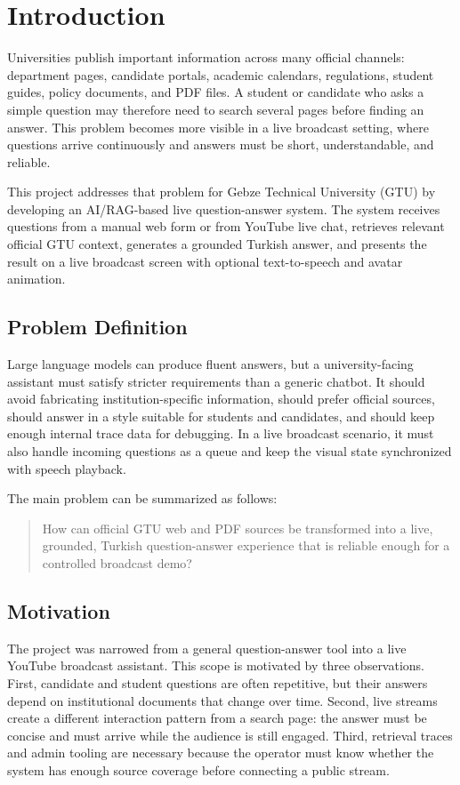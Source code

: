 \chapter{Introduction}

Universities publish important information across many official channels: department pages, candidate portals, academic calendars, regulations, student guides, policy documents, and PDF files. A student or candidate who asks a simple question may therefore need to search several pages before finding an answer. This problem becomes more visible in a live broadcast setting, where questions arrive continuously and answers must be short, understandable, and reliable.

This project addresses that problem for Gebze Technical University (GTU) by developing an AI/RAG-based live question-answer system. The system receives questions from a manual web form or from YouTube live chat, retrieves relevant official GTU context, generates a grounded Turkish answer, and presents the result on a live broadcast screen with optional text-to-speech and avatar animation.

\section{Problem Definition}

Large language models can produce fluent answers, but a university-facing assistant must satisfy stricter requirements than a generic chatbot. It should avoid fabricating institution-specific information, should prefer official sources, should answer in a style suitable for students and candidates, and should keep enough internal trace data for debugging. In a live broadcast scenario, it must also handle incoming questions as a queue and keep the visual state synchronized with speech playback.

The main problem can be summarized as follows:

\begin{quote}
How can official GTU web and PDF sources be transformed into a live, grounded, Turkish question-answer experience that is reliable enough for a controlled broadcast demo?
\end{quote}

\section{Motivation}

The project was narrowed from a general question-answer tool into a live YouTube broadcast assistant. This scope is motivated by three observations. First, candidate and student questions are often repetitive, but their answers depend on institutional documents that change over time. Second, live streams create a different interaction pattern from a search page: the answer must be concise and must arrive while the audience is still engaged. Third, retrieval traces and admin tooling are necessary because the operator must know whether the system has enough source coverage before connecting a public stream.

